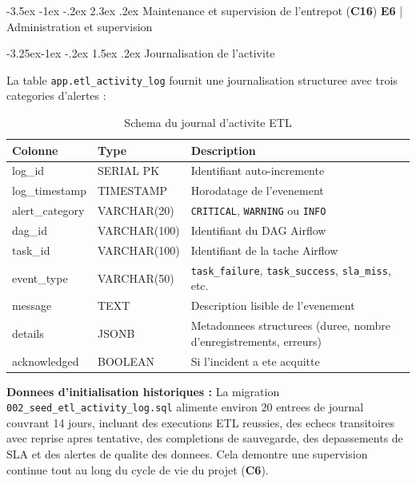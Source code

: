 \documentclass[a4paper,11pt,oneside,openany]{report}
\makeatletter
\renewcommand\section{\@startsection{section}{1}{\z@}%
  {-3.5ex \@plus -1ex \@minus -.2ex}%
  {2.3ex \@plus.2ex}%
  {\normalfont\Large\bfseries\color{ntgreen}}}
\renewcommand\subsection{\@startsection{subsection}{2}{\z@}%
  {-3.25ex\@plus -1ex \@minus -.2ex}%
  {1.5ex \@plus .2ex}%
  {\normalfont\large\bfseries\color{ntdarkgreen}}}
\newcommand{\competence}[1]{\textbf{\textcolor{ntgreen}{#1}}}
\newcommand{\evaluation}[1]{\textbf{\textcolor{ntblue}{#1}}}
\makeatother
\begin{document}
\section{Maintenance et supervision de l'entrepot (\competence{C16})}
\label{sec:c16}
{\small\evaluation{E6} | Administration et supervision}

\subsection{Journalisation de l'activite}

La table \texttt{app.etl\_activity\_log} fournit une journalisation
structuree avec trois categories d'alertes :

\begin{table}[H]
\centering
\caption{Schema du journal d'activite ETL}
\label{tab:activity-log}
\begin{tabularx}{\textwidth}{L{3cm} L{2.5cm} L{7cm}}
\toprule
\textbf{Colonne} & \textbf{Type} & \textbf{Description} \\
\midrule
log\_id & SERIAL PK & Identifiant auto-incremente \\
log\_timestamp & TIMESTAMP & Horodatage de l'evenement \\
alert\_category & VARCHAR(20) & \texttt{CRITICAL}, \texttt{WARNING} ou \texttt{INFO} \\
dag\_id & VARCHAR(100) & Identifiant du DAG Airflow \\
task\_id & VARCHAR(100) & Identifiant de la tache Airflow \\
event\_type & VARCHAR(50) & \texttt{task\_failure}, \texttt{task\_success}, \texttt{sla\_miss}, etc. \\
message & TEXT & Description lisible de l'evenement \\
details & JSONB & Metadonnees structurees (duree, nombre d'enregistrements, erreurs) \\
acknowledged & BOOLEAN & Si l'incident a ete acquitte \\
\bottomrule
\end{tabularx}
\end{table}

\textbf{Donnees d'initialisation historiques :} La migration
\texttt{002\_seed\_etl\_activity\_log.sql} alimente environ 20 entrees
de journal couvrant 14 jours, incluant des executions ETL reussies, des
echecs transitoires avec reprise apres tentative, des completions de
sauvegarde, des depassements de SLA et des alertes de qualite des
donnees. Cela demontre une supervision continue tout au long du cycle de
vie du projet (\competence{C6}).
\end{document}
